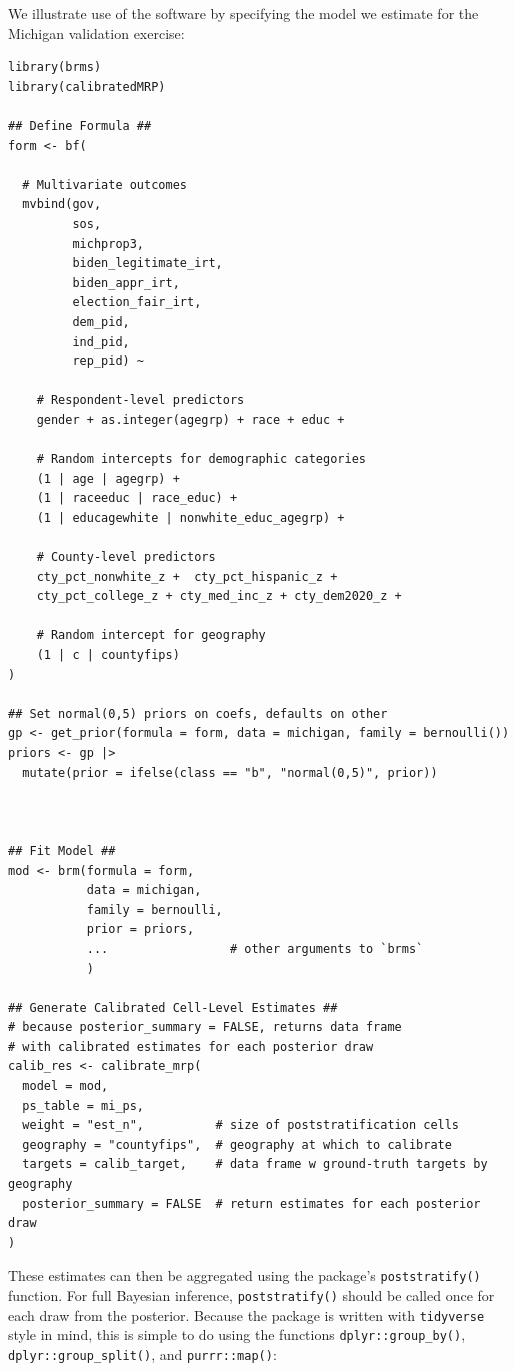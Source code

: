 We illustrate use of the software by specifying the model we estimate for the Michigan validation exercise:
\begin{small}
\singlespacing
\lstset{language=R}
\begin{lstlisting}
library(brms)
library(calibratedMRP)

## Define Formula ##
form <- bf(
  
  # Multivariate outcomes
  mvbind(gov, 
         sos, 
         michprop3,
         biden_legitimate_irt,
         biden_appr_irt,
         election_fair_irt,
         dem_pid, 
         ind_pid, 
         rep_pid) ~
    
    # Respondent-level predictors
    gender + as.integer(agegrp) + race + educ + 

    # Random intercepts for demographic categories
    (1 | age | agegrp) + 
    (1 | raceeduc | race_educ) + 
    (1 | educagewhite | nonwhite_educ_agegrp) + 
    
    # County-level predictors
    cty_pct_nonwhite_z +  cty_pct_hispanic_z +
    cty_pct_college_z + cty_med_inc_z + cty_dem2020_z +
    
    # Random intercept for geography
    (1 | c | countyfips) 
)

## Set normal(0,5) priors on coefs, defaults on other
gp <- get_prior(formula = form, data = michigan, family = bernoulli())
priors <- gp |>
  mutate(prior = ifelse(class == "b", "normal(0,5)", prior)) 



## Fit Model ##
mod <- brm(formula = form, 
           data = michigan,
           family = bernoulli,
           prior = priors,
           ...                 # other arguments to `brms`
           )

## Generate Calibrated Cell-Level Estimates ##
# because posterior_summary = FALSE, returns data frame
# with calibrated estimates for each posterior draw
calib_res <- calibrate_mrp(
  model = mod,
  ps_table = mi_ps,
  weight = "est_n",          # size of poststratification cells
  geography = "countyfips",  # geography at which to calibrate
  targets = calib_target,    # data frame w ground-truth targets by geography
  posterior_summary = FALSE  # return estimates for each posterior draw
)
\end{lstlisting}
\end{small}

These estimates can then be aggregated using the package's \texttt{poststratify()} function. For full Bayesian inference, \texttt{poststratify()} should be called once for each draw from the posterior. Because the package is written with \texttt{tidyverse} style in mind, this is simple to do using the functions \texttt{dplyr::group\_by()}, \texttt{dplyr::group\_split()}, and \texttt{purrr::map()}:

